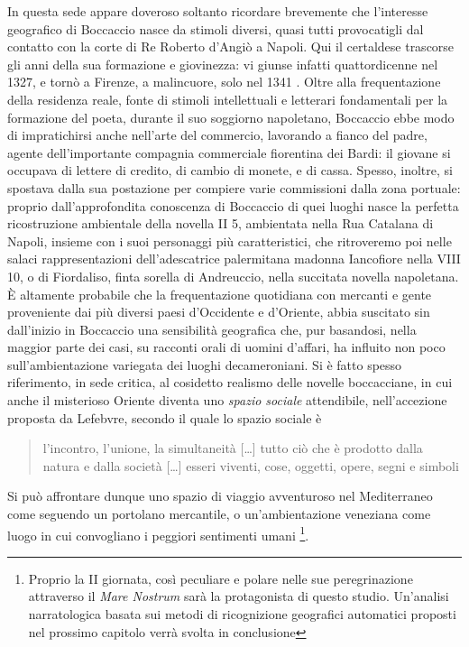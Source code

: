 In questa sede appare doveroso soltanto ricordare brevemente che
l'interesse geografico di Boccaccio nasce da stimoli diversi, quasi
tutti provocatigli dal contatto con la corte di Re Roberto d'Angiò a
Napoli. Qui il certaldese trascorse gli anni della sua formazione e
giovinezza: vi giunse infatti quattordicenne nel 1327, e tornò a
Firenze, a malincuore, solo nel 1341
\autocite[pp.~16-40]{branca1977giovanni}. Oltre alla frequentazione
della residenza reale, fonte di stimoli intellettuali e letterari
fondamentali per la formazione del poeta, durante il suo soggiorno
napoletano, Boccaccio ebbe modo di impratichirsi anche nell'arte del
commercio, lavorando a fianco del padre, agente dell'importante
compagnia commerciale fiorentina dei Bardi: il giovane si occupava di
lettere di credito, di cambio di monete, e di cassa. Spesso, inoltre, si
spostava dalla sua postazione per compiere varie commissioni dalla zona
portuale: proprio dall'approfondita conoscenza di Boccaccio di quei
luoghi nasce la perfetta ricostruzione ambientale della novella II 5,
ambientata nella Rua Catalana di Napoli, insieme con i suoi personaggi
più caratteristici, che ritroveremo poi nelle salaci rappresentazioni
dell'adescatrice palermitana madonna Iancofiore nella VIII 10, o di
Fiordaliso, finta sorella di Andreuccio, nella succitata novella
napoletana. È altamente probabile che la frequentazione quotidiana con
mercanti e gente proveniente dai più diversi paesi d'Occidente e
d'Oriente, abbia suscitato sin dall'inizio in Boccaccio una sensibilità
geografica che, pur basandosi, nella maggior parte dei casi, su racconti
orali di uomini d'affari, ha influito non poco sull'ambientazione
variegata dei luoghi decameroniani. Si è fatto spesso riferimento, in
sede critica, al cosidetto realismo delle novelle boccacciane, in cui
anche il misterioso Oriente diventa uno \emph{spazio sociale}
attendibile, nell'accezione proposta da Lefebvre, secondo il quale lo
spazio sociale è

\begin{quote}
l'incontro, l'unione, la simultaneità {[}\ldots{}{]} tutto ciò che è
prodotto dalla natura e dalla società {[}\ldots{}{]} esseri viventi,
cose, oggetti, opere, segni e simboli \autocite[p.116]{lefebvre1978}
\end{quote}

Si può affrontare dunque uno spazio di viaggio avventuroso nel
Mediterraneo come seguendo un portolano mercantile, o un'ambientazione
veneziana come luogo in cui convogliano i peggiori sentimenti umani
\footnote{Proprio la II giornata, così peculiare e polare nelle sue
  peregrinazione attraverso il \emph{Mare Nostrum} sarà la protagonista
  di questo studio. Un'analisi narratologica basata sui metodi di
  ricognizione geografici automatici proposti nel prossimo capitolo
  verrà svolta in conclusione}.


